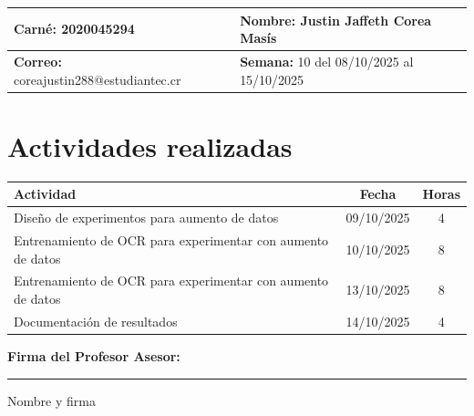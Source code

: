 \documentclass[12pt,a4paper]{article}
\begin{document}
\noindent
\begin{tabularx}{\textwidth}{|X|X|}
\hline
\textbf{Carné:} 2020045294 & \textbf{Nombre:} Justin Jaffeth Corea Masís \\
\hline
\textbf{Correo:} coreajustin288@estudiantec.cr & \textbf{Semana:} 10 del 08/10/2025 al 15/10/2025 \\
\hline
\end{tabularx}

\vspace{0.5cm}

\section*{Actividades realizadas}

\begin{tabularx}{\textwidth}{|>{\raggedright\arraybackslash}p{12cm}|c|c|}
\hline
\textbf{Actividad} & \textbf{Fecha} & \textbf{Horas} \\
\hline
	Diseño de experimentos para aumento de datos & 09/10/2025 & 4 \\
\hline
	Entrenamiento de OCR para experimentar con aumento de datos & 10/10/2025 & 8 \\
\hline
	Entrenamiento de OCR para experimentar con aumento de datos & 13/10/2025 & 8 \\
\hline
	Documentación de resultados & 14/10/2025 & 4 \\
\hline
\end{tabularx}

\vspace{1cm}

\noindent
\textbf{Firma del Profesor Asesor:}

\vspace{2cm}

\noindent\rule{8cm}{0.4pt}  
Nombre y firma
\end{document}
